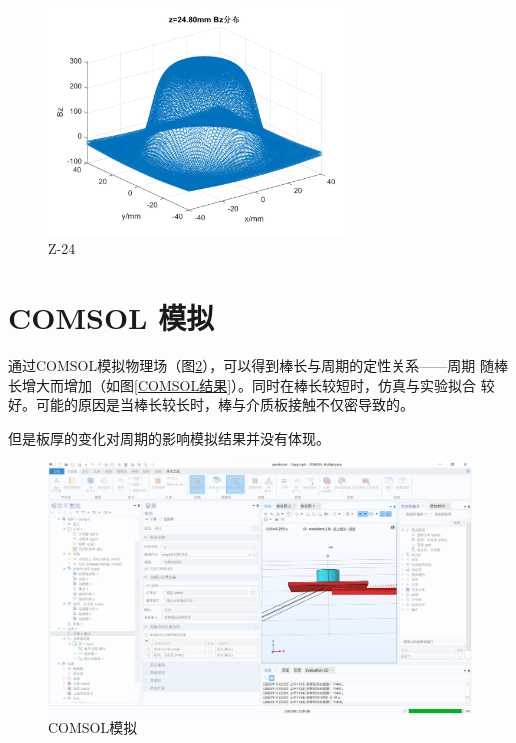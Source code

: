 \documentclass[AutoFakeBold]{LZUThesis}
\begin{document}
\begin{figure}[H]
    \centering
    \includegraphics[width=8cm]{figures/z24.png}
    \caption{Z-24}
    \label{z24}
\end{figure}

\section{COMSOL 模拟}
通过COMSOL模拟物理场（图\ref{COMSOL}），可以得到棒长与周期的定性关系——周期
随棒长增大而增加（如图\ref{COMSOL结果}）。同时在棒长较短时，仿真与实验拟合
较好。可能的原因是当棒长较长时，棒与介质板接触不仅密导致的。

但是板厚的变化对周期的影响模拟结果并没有体现。


\begin{figure}[H]
    \centering
    \includegraphics[width=12cm]{figures/COMSOL.png}
    \caption{COMSOL模拟}
    \label{COMSOL}
\end{figure}
\end{document}
